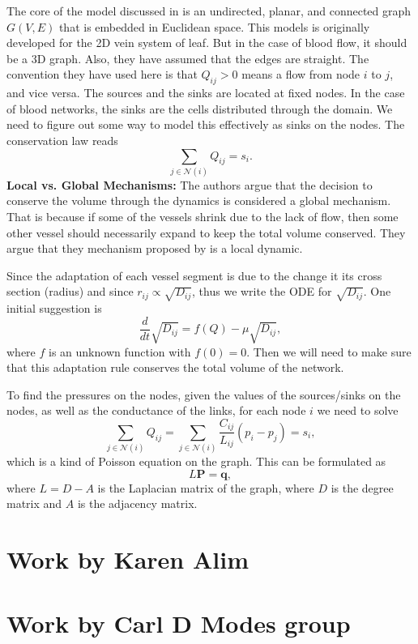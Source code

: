 \documentclass[10pt,a4paper,twocolumn]{article}
\begin{document}
	The core of the model discussed in \cite{Almeida2023} is an undirected, planar, and connected graph $ G(V,E) $ that is embedded in Euclidean space. This models is originally developed for the 2D vein system of leaf. But in the case of blood flow, it should be a 3D graph. Also, they have assumed that the edges are straight. The convention they have used here is that $ Q_{ij}>0 $ means a flow from node $ i $ to $ j $, and vice versa. The sources and the sinks are located at fixed nodes. In the case of blood networks, the sinks are the cells distributed through the domain. We need to figure out some way to model this effectively as sinks on the nodes. The conservation law reads
	\[ \sum_{j\in\mathcal{N}(i)}Q_{ij} = s_i. \]
	\textbf{Local vs. Global Mechanisms:} The authors argue that the decision to conserve the volume through the dynamics is considered a global mechanism. That is because if some of the vessels shrink due to the lack of flow, then some other vessel should necessarily expand to keep the total volume conserved. They argue that they mechanism proposed by \cite{Tero2010} is a local dynamic.
	
	Since the adaptation of each vessel segment is due to the change it its cross section (radius) and since $ r_{ij} \propto \sqrt{D_{ij}} $, thus we write the ODE for $ \sqrt{D_{ij}} $. One initial suggestion is
	\[ \frac{d}{dt} \sqrt{D_{ij}} = f(Q) - \mu \sqrt{D_{ij}},\]
	where $ f $ is an unknown function with $ f(0) = 0 $. Then we will need to make sure that this adaptation rule conserves the total volume of the network.
	
	To find the pressures on the nodes, given the values of the sources/sinks on the nodes, as well as the conductance of the links, for each node $ i $ we need to solve
	\[ \sum_{j\in\mathcal{N}(i)}Q_{ij} = \sum_{j\in\mathcal{N}(i)}\frac{C_{ij}}{L_{ij}}(p_i - p_j) = s_i, \]
	which is a kind of Poisson equation on the graph. This can be formulated as
	\[ L \mathbf{P} = \mathbf{q}, \]
	where $ L = D - A $ is the Laplacian matrix of the graph, where $ D $ is the degree matrix and $ A $ is the adjacency matrix.
	
	
	\newpage
	\section{Work by Karen Alim}
	
	\section{Work by Carl D Modes group}
	
\end{document}
